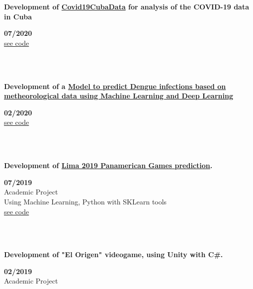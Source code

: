 \documentclass{article}
\begin{document}
\begin{minipage}{0.8\textwidth}
\parbox{0.8\linewidth}{\textbf{Development of \hyperref[sec:covid]{Covid19CubaData} for analysis of the COVID-19 data in Cuba}} \hfill \textbf{07/2020}\\
\href{https://github.com/covid19cuba/covid19cuba-action}{see code}\\
\end{minipage} \hfill {}\\\\
\begin{minipage}{0.8\textwidth}
\parbox{0.8\linewidth}{\textbf{Development of a \hyperref[sec:dengue]{Model to predict Dengue infections based on metheorological data using Machine Learning and Deep Learning}}} \hfill \textbf{02/2020}\\
\href{https://github.com/JavierOramas/DengAI}{see code}\\
\end{minipage} \hfill {}\\\\
\begin{minipage}{0.8\textwidth}
\parbox{0.8\linewidth}{\textbf{Development of \hyperref[sec:panamerican]{Lima 2019 Panamerican Games prediction}.}} \hfill \textbf{07/2019}\\
Academic Project\\
Using Machine Learning,  Python with SKLearn tools\\
\href{https://github.com/JavierOramas/PanamericanPredictor}{see code}\\
\end{minipage} \hfill {}\\\\
\begin{minipage}{0.8\textwidth}
\parbox{0.8\linewidth}{\textbf{Development of "El Origen" videogame, using Unity with C\#.}} \hfill \textbf{02/2019}\\
Academic Project\\
\end{minipage} \\
\end{document}
